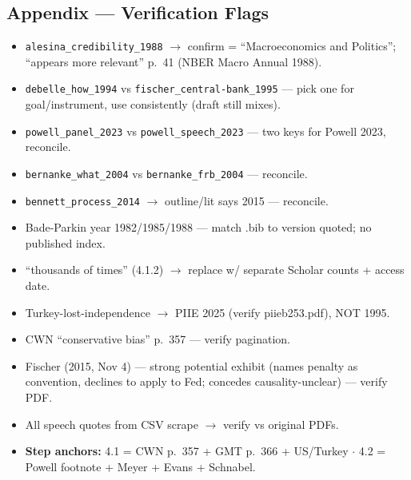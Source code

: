 \documentclass[12pt,a4paper]{article}
\begin{document}
\begin{doublespace}
\newpage
\section*{Appendix --- Verification Flags}

\begin{itemize}
    \item \texttt{alesina\_credibility\_1988} $\rightarrow$ confirm = ``Macroeconomics and Politics''; ``appears more relevant'' p.\ 41 (NBER Macro Annual 1988).
    \item \texttt{debelle\_how\_1994} vs \texttt{fischer\_central-bank\_1995} --- pick one for goal/instrument, use consistently (draft still mixes).
    \item \texttt{powell\_panel\_2023} vs \texttt{powell\_speech\_2023} --- two keys for Powell 2023, reconcile.
    \item \texttt{bernanke\_what\_2004} vs \texttt{bernanke\_frb\_2004} --- reconcile.
    \item \texttt{bennett\_process\_2014} $\rightarrow$ outline/lit says 2015 --- reconcile.
    \item Bade-Parkin year 1982/1985/1988 --- match .bib to version quoted; no published index.
    \item ``thousands of times'' (4.1.2) $\rightarrow$ replace w/ separate Scholar counts + access date.
    \item Turkey-lost-independence $\rightarrow$ PIIE 2025 (verify piieb253.pdf), NOT 1995.
    \item CWN ``conservative bias'' p.\ 357 --- verify pagination.
    \item Fischer (2015, Nov 4) --- strong potential exhibit (names penalty as convention, declines to apply to Fed; concedes causality-unclear) --- verify PDF.
    \item All speech quotes from CSV scrape $\rightarrow$ verify vs original PDFs.
    \item \textbf{Step anchors:} 4.1 = CWN p.\ 357 + GMT p.\ 366 + US/Turkey $\cdot$ 4.2 = Powell footnote + Meyer + Evans + Schnabel.
\end{itemize}

\end{doublespace}
\end{document}
